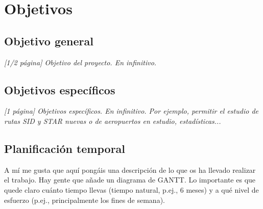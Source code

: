 \chapter{Objetivos} %
\label{chap:objetivos}

\section{Objetivo general} %
\label{sec:objetivo-general} %

\textit{[1/2 página] Objetivo del proyecto. En infinitivo.}


\section{Objetivos específicos}
\label{sec:objetivos-especificos}

\textit{[1 página] Objetivos específicos. En infinitivo. Por ejemplo, permitir el estudio de rutas SID y STAR nuevas o de aeropuertos en estudio, estadísticas...}


\section{Planificación temporal}
\label{sec:planificacion-temporal}

A mí me gusta que aquí pongáis una descripción de lo que os ha llevado realizar el trabajo.
Hay gente que añade un diagrama de GANTT.
Lo importante es que quede claro cuánto tiempo llevas (tiempo natural, p.ej., 6 meses) y a qué nivel de esfuerzo (p.ej., principalmente los fines de semana).